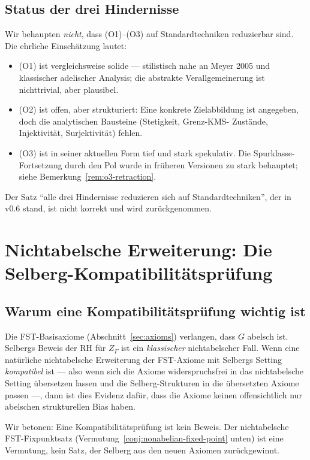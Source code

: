 \documentclass[11pt,a4paper]{article}
\theoremstyle{plain}
\theoremstyle{definition}
\begin{document}
\subsection{Status der drei Hindernisse}

Wir behaupten \emph{nicht}, dass (O1)--(O3) auf Standardtechniken
reduzierbar sind. Die ehrliche Einschätzung lautet:
\begin{itemize}[leftmargin=*]
\item (O1) ist vergleichsweise solide --- stilistisch nahe an Meyer 2005
  und klassischer adelischer Analysis; die abstrakte Verallgemeinerung ist
  nichttrivial, aber plausibel.
\item (O2) ist offen, aber strukturiert: Eine konkrete Zielabbildung ist
  angegeben, doch die analytischen Bausteine (Stetigkeit, Grenz-KMS-
  Zustände, Injektivität, Surjektivität) fehlen.
\item (O3) ist in seiner aktuellen Form tief und stark spekulativ. Die
  Spurklasse-Fortsetzung durch den Pol wurde in früheren Versionen zu
  stark behauptet; siehe Bemerkung~\ref{rem:o3-retraction}.
\end{itemize}
Der Satz ``alle drei Hindernisse reduzieren sich auf Standardtechniken'',
der in v0.6 stand, ist nicht korrekt und wird zurückgenommen.

\section{Nichtabelsche Erweiterung: Die Selberg-Kompatibilitätsprüfung}
\label{sec:selberg}

\subsection{Warum eine Kompatibilitätsprüfung wichtig ist}

Die FST-Basisaxiome (Abschnitt~\ref{sec:axioms}) verlangen, dass $G$
abelsch ist. Selbergs Beweis der RH für $Z_\Gamma$ ist ein
\emph{klassischer} nichtabelscher Fall. Wenn eine natürliche nichtabelsche
Erweiterung der FST-Axiome mit Selbergs Setting \emph{kompatibel} ist ---
also wenn sich die Axiome widerspruchsfrei in das nichtabelsche Setting
übersetzen lassen und die Selberg-Strukturen in die übersetzten Axiome
passen ---, dann ist dies Evidenz dafür, dass die Axiome keinen offensichtlich
nur abelschen strukturellen Bias haben.

Wir betonen: Eine Kompatibilitätsprüfung ist kein Beweis. Der nichtabelsche
FST-Fixpunktsatz (Vermutung~\ref{conj:nonabelian-fixed-point} unten) ist
eine Vermutung, kein Satz, der Selberg aus den neuen Axiomen zurückgewinnt.
\end{document}
